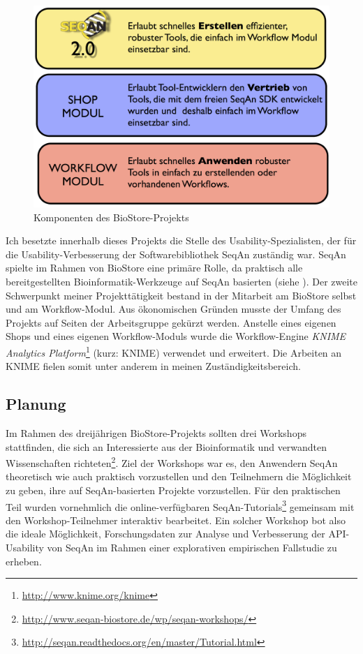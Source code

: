 \begin{figure}
  \centering
    \includegraphics[width=0.6\linewidth]{Figures/seqan20.png}
  \caption[BioStore-Komponenten]{Komponenten des BioStore-Projekts \citep{Reinert:2011vl}}
  \label{fig:biostore-demonstrator}
\end{figure}

Ich besetzte innerhalb dieses Projekts die Stelle des Usability-Spezialisten, der für die Usability-Verbesserung der Softwarebibliothek SeqAn zuständig war. SeqAn spielte im Rahmen von BioStore eine primäre Rolle, da praktisch alle bereitgestellten Bioinformatik-Werkzeuge auf SeqAn basierten (siehe ). Der zweite Schwerpunkt meiner Projekttätigkeit bestand in der Mitarbeit am BioStore selbst und am Workflow-Modul. Aus ökonomischen Gründen musste der Umfang des Projekts auf Seiten der Arbeitsgruppe gekürzt werden. Anstelle eines eigenen Shops und eines eigenen Workflow-Moduls wurde die Workflow-Engine \textit{KNIME Analytics Platform}\footnote{\url{http://www.knime.org/knime}} (kurz: KNIME) verwendet und erweitert. Die Arbeiten an KNIME fielen somit unter anderem in meinen Zuständigkeitsbereich.



\subsection{Planung}

\label{sec:data-sources-workshop}
Im Rahmen des dreijährigen BioStore-Projekts sollten drei Workshops stattfinden, die sich an Interessierte aus der Bioinformatik und verwandten Wissenschaften richteten\footnote{\url{http://www.seqan-biostore.de/wp/seqan-workshops/}}. Ziel der Workshops war es, den Anwendern SeqAn theoretisch wie auch praktisch vorzustellen und den Teilnehmern die Möglichkeit zu geben, ihre auf SeqAn-basierten Projekte vorzustellen. Für den praktischen Teil wurden vornehmlich die online-verfügbaren SeqAn-Tutorials\footnote{\url{http://seqan.readthedocs.org/en/master/Tutorial.html}} gemeinsam mit den Workshop-Teilnehmer interaktiv bearbeitet. Ein solcher Workshop bot also die ideale Möglichkeit, Forschungsdaten zur Analyse und Verbesserung der API-Usability von SeqAn im Rahmen einer explorativen empirischen Fallstudie zu erheben.

